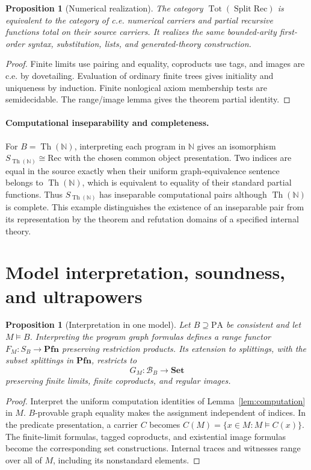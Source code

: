\documentclass[11pt]{article}
\newtheorem{proposition}[theorem]{Proposition}
\theoremstyle{definition}\newtheorem{definition}[theorem]{Definition}
\newcommand{\PA}{\mathrm{PA}}
\newcommand{\N}{\mathbb N}
\newcommand{\Set}{\mathbf{Set}}
\newcommand{\Pfn}{\mathbf{Pfn}}
\newcommand{\Tot}{\operatorname{Tot}}
\newcommand{\Split}{\operatorname{Split}}
\newcommand{\Th}{\operatorname{Th}}
\newcommand{\B}{\mathcal B}
\begin{document}
\begin{proposition}[Numerical realization]\label{prop:rec-realization}
The category $\Tot(\Split\mathrm{Rec})$ is equivalent to the category
of c.e. numerical carriers and partial recursive functions total on
their source carriers. It realizes the same bounded-arity first-order
syntax, substitution, lists, and generated-theory construction.
\end{proposition}
\begin{proof}
Finite limits use pairing and equality, coproducts use tags, and
images are c.e. by dovetailing. Evaluation of ordinary finite trees
gives initiality and uniqueness by induction. Finite nonlogical
axiom membership tests are semidecidable. The range/image lemma gives
the theorem partial identity.
\end{proof}

\paragraph{Computational inseparability and completeness.}
For $B=\Th(\N)$, interpreting each program in $\N$ gives an
isomorphism $S_{\Th(\N)}\cong\mathrm{Rec}$ with the chosen common
object presentation. Two indices are equal in the source exactly
when their uniform graph-equivalence sentence belongs to
$\Th(\N)$, which is equivalent to equality of their standard
partial functions. Thus $S_{\Th(\N)}$ has inseparable computational
pairs although $\Th(\N)$ is complete. This example distinguishes
the existence of an inseparable pair from its representation by
the theorem and refutation domains of a specified internal theory.

\section{Model interpretation, soundness, and ultrapowers}

\begin{proposition}[Interpretation in one model]\label{prop:model}
Let $B\supseteq\PA$ be consistent and let $M\models B$.
Interpreting the program graph formulas defines a range functor
$F_M:S_B\to\Pfn$ preserving restriction products. Its extension
to splittings, with the subset splittings in $\Pfn$, restricts to
\[
 G_M:\B_B\longrightarrow\Set
\]
preserving finite limits, finite coproducts, and regular images.
\end{proposition}
\begin{proof}
Interpret the uniform computation identities of
Lemma~\ref{lem:computation} in $M$. $B$-provable graph equality
makes the assignment independent of indices. In the predicate
presentation, a carrier $C$ becomes
$C(M)=\{x\in M:M\models C(x)\}$. The finite-limit formulas,
tagged coproducts, and existential image formulas become the
corresponding set constructions. Internal traces and witnesses range
over all of $M$, including its nonstandard elements.
\end{proof}
\end{document}
